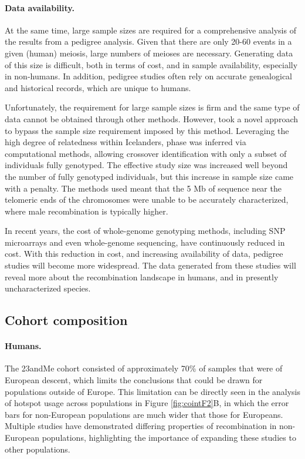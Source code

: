 \paragraph{Data availability.}
At the same time, large sample sizes are required for a comprehensive analysis of the results from a pedigree analysis.
Given that there are only 20-60 events in a given (human) meiosis\cite{Broman1998,Coop2008,Kong2010}, large numbers of meioses are necessary.
Generating data of this size is difficult, both in terms of cost, and in sample availability, especially in non-humans.
In addition, pedigree studies often rely on accurate genealogical and historical records, which are unique to humans.

Unfortunately, the requirement for large sample sizes is firm and the same type of data cannot be obtained through other methods.
However, \citet{Kong2010} took a novel approach to bypass the sample size requirement imposed by this method.
Leveraging the high degree of relatedness within Icelanders, phase was inferred via computational methods, allowing crossover identification with only a subset of individuals fully genotyped.
The effective study size was increased well beyond the number of fully genotyped individuals, but this increase in sample size came with a penalty.
The methods used meant that the 5 Mb of sequence near the telomeric ends of the chromosomes were unable to be accurately characterized, where male recombination is typically higher.

In recent years, the cost of whole-genome genotyping methods, including SNP microarrays and even whole-genome sequencing, have continuously reduced in cost.
With this reduction in cost, and increasing availability of data, pedigree studies will become more widespread.
The data generated from these studies will reveal more about the recombination landscape in humans, and in presently uncharacterized species.

\subsection{Cohort composition}
\paragraph{Humans.}
The 23andMe cohort consisted of approximately 70\% of samples that were of European descent, which limits the conclusions that could be drawn for populations outside of Europe.
This limitation can be directly seen in the analysis of hotspot usage across populations in Figure \ref{fig:cointF2}B, in which the error bars for non-European populations are much wider that those for Europeans.
Multiple studies have demonstrated differing properties of recombination in non-European populations\cite{Bleazard2013,Hinch2011,Berg2011}, highlighting the importance of expanding these studies to other populations.

